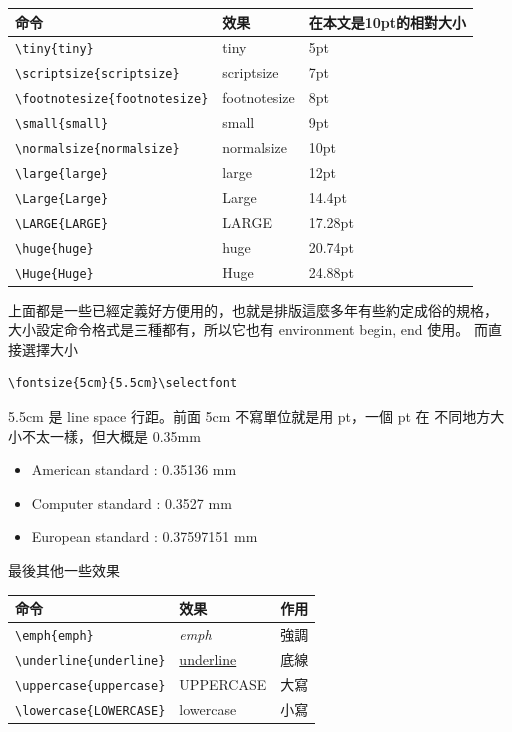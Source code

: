 \begin{center}
\begin{tabular}[t]{lll}
命令 & 效果 & 在本文是10pt的相對大小 \\
\hline
\hline
\verb=\tiny{tiny}= & \tiny{tiny} & 5pt \\
\verb=\scriptsize{scriptsize}= & \scriptsize{scriptsize} & 7pt \\
\verb=\footnotesize{footnotesize}= & \footnotesize{footnotesize} & 8pt \\
\verb=\small{small}= & \small{small} & 9pt \\
\verb=\normalsize{normalsize}= & \normalsize{normalsize} & 10pt \\
\verb=\large{large}= & \large{large} & 12pt \\
\verb=\Large{Large}= & \Large{Large} & 14.4pt \\
\verb=\LARGE{LARGE}= & \LARGE{LARGE} & 17.28pt \\
\verb=\huge{huge}= & \huge{huge} & 20.74pt \\
\verb=\Huge{Huge}= & \Huge{Huge} & 24.88pt \\
\end{tabular}
\end{center}
上面都是一些已經定義好方便用的，也就是排版這麼多年有些約定成俗的規格，
大小設定命令格式是三種都有，所以它也有 environment begin, end 使用。
而直接選擇大小
\begin{verbatim}
\fontsize{5cm}{5.5cm}\selectfont
\end{verbatim}
5.5cm 是 line space 行距。前面 5cm 不寫單位就是用 pt，一個 pt 在
不同地方大小不太一樣，但大概是 0.35mm
\begin{itemize}
\item American standard : 0.35136 mm
\item Computer standard : 0.3527 mm
\item European standard : 0.37597151 mm
\end{itemize}

最後其他一些效果

\begin{center}
\begin{tabular}[t]{lll}
命令 & 效果 & 作用 \\
\hline
\hline
\verb=\emph{emph}= & \emph{emph} & 強調 \\
\verb=\underline{underline}= & \underline{underline} & 底線  \\
\verb=\uppercase{uppercase}= & \uppercase{uppercase} & 大寫  \\
\verb=\lowercase{LOWERCASE}= & \lowercase{LOWERCASE} & 小寫  \\
\end{tabular}
\end{center}

